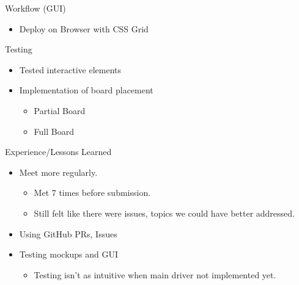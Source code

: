 \documentclass[presentation]{beamer}
\begin{document}
\begin{frame}[label={sec:orgc97e722}]{Workflow (GUI)}
\begin{itemize}
\item Deploy on Browser with CSS Grid
\end{itemize}
\end{frame}
\begin{frame}[label={sec:orgb44ed15}]{Testing}
\begin{itemize}
\item Tested interactive elements
\item Implementation of board placement
\begin{itemize}
\item Partial Board
\item Full Board
\end{itemize}
\end{itemize}
\end{frame}
\begin{frame}[label={sec:org63ace63}]{Experience/Lessons Learned}
\begin{itemize}
\item Meet more regularly.
\begin{itemize}
\item Met 7 times before submission.
\item Still felt like there were issues, topics we could have better addressed.
\end{itemize}
\item Using GitHub PRs, Issues
\item Testing mockups and GUI
\begin{itemize}
\item Testing isn't as intuitive when main driver not implemented yet.
\end{itemize}
\end{itemize}
\end{frame}
\end{document}
